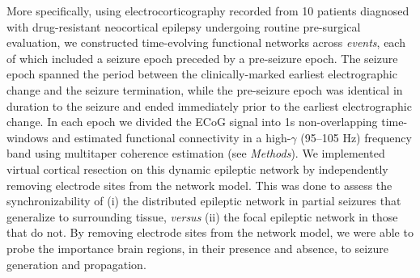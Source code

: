 More specifically, using electrocorticography recorded from 10 patients diagnosed with drug-resistant neocortical epilepsy undergoing routine pre-surgical evaluation, we constructed time-evolving functional networks across \emph{events}, each of which included a seizure epoch preceded by a pre-seizure epoch. The seizure epoch spanned the period between the clinically-marked earliest electrographic change \cite{litt2001epileptic} and the seizure termination, while the pre-seizure epoch was identical in duration to the seizure and ended immediately prior to the earliest electrographic change. In each epoch we divided the ECoG signal into 1s non-overlapping time-windows and estimated functional connectivity in a high-$\gamma$ (95--105 Hz) frequency band using multitaper coherence estimation (see \textit{Methods}). We implemented virtual cortical resection on this dynamic epileptic network by independently removing electrode sites from the network model. This was done to assess the synchronizability of (i) the distributed epileptic network in partial seizures that generalize to surrounding tissue, \emph{versus} (ii) the focal epileptic network in those that do not. By removing electrode sites from the network model, we were able to probe the importance brain regions, in their presence and absence, to seizure generation and propagation.

